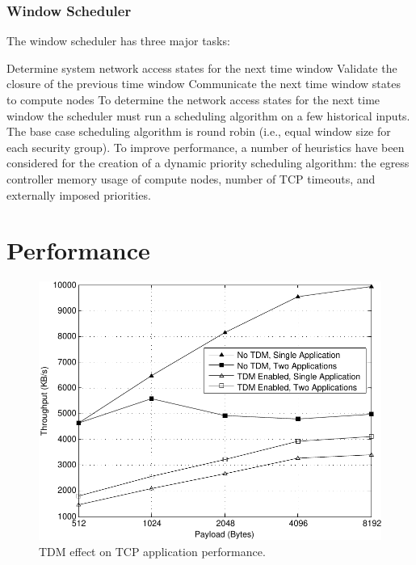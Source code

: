 \documentclass[oneside,12pt]{memoir}
\begin{document}
\subsection{Window Scheduler}
The window scheduler has three major tasks: 

Determine system network access states for the next time window 
Validate the closure of the previous time window
Communicate the next time window states to compute nodes
To determine the network access states for the next time window the scheduler must run a scheduling algorithm on a few historical inputs. The base case scheduling algorithm is round robin (i.e., equal window size for each security group). To improve performance, a number of heuristics have been considered for the creation of a dynamic priority scheduling algorithm: the egress controller memory usage of compute nodes, number of TCP timeouts, and externally imposed priorities. 
\chapter{Performance}

\begin{figure}
\centerline{\includegraphics[scale=0.8]{TCP_Performance.pdf}}
\caption{TDM effect on TCP application performance.}
\label{fig:TCP_Performance}
\end{figure}
\end{document}
